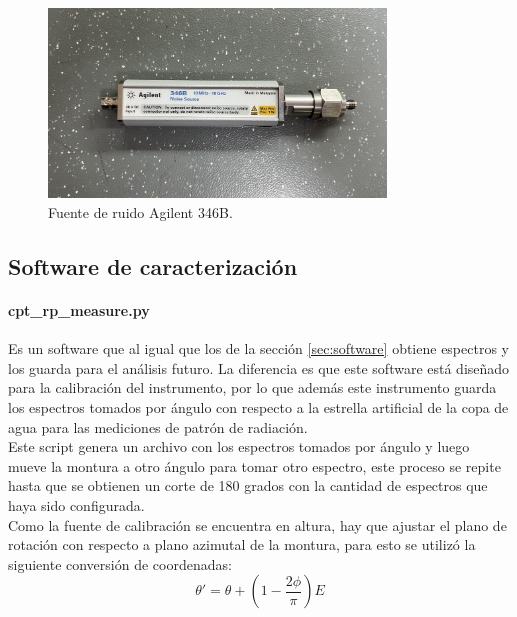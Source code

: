 \begin{figure}
    \centering
    \includegraphics[width=0.8\textwidth]{img/fuenteRuido}
    \caption{Fuente de ruido Agilent 346B.}
    \label{fig:fuente_ruido}
\end{figure}

\subsection{Software de caracterización}

\paragraph{cpt\_rp\_measure.py} Es un software que al igual que los de la sección \ref{sec:software} obtiene espectros y los guarda para el análisis futuro. La diferencia es que este software está diseñado para la calibración del instrumento, por lo que además este instrumento guarda los espectros tomados por ángulo con respecto a la estrella artificial de la copa de agua para las mediciones de patrón de radiación.\\

Este script genera un archivo con los espectros tomados por ángulo y luego mueve la montura a otro ángulo para tomar otro espectro, este proceso se repite hasta que se obtienen un corte de 180 grados con la cantidad de espectros que haya sido configurada.\\

Como la fuente de calibración se encuentra en altura, hay que ajustar el plano de rotación con respecto a plano azimutal de la montura, para esto se utilizó la siguiente conversión de coordenadas:\\

\begin{equation}
    \theta' = \theta + \left(1- \frac{2\phi}{\pi}\right)E
\end{equation}

